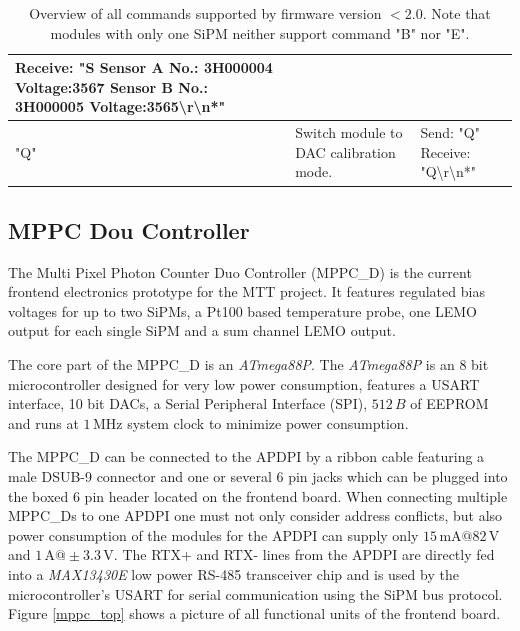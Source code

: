 \documentclass[]{article}
\begin{document}
\begin{table}
\begin{center}
\begin{tabular}[]{|l||p{6cm}|p{4cm}|}
			\newline Receive: "S Sensor A No.: 3H000004 Voltage:3567 Sensor B No.: 3H000005 Voltage:3565\textbackslash r\textbackslash n*" \\
			\hline
			"Q" & Switch module to DAC calibration mode. & Send: "Q" \newline Receive: "Q\textbackslash r\textbackslash n*" \\
			\hline
			\end{tabular}
		\end{center}
		\caption{Overview of all commands supported by firmware version $<2.0$. Note that modules with only one SiPM neither support command "B" nor "E".}
		\label{sipm_bus_table}
	\end{table}

\subsection{MPPC Dou Controller}

The Multi Pixel Photon Counter Duo Controller (MPPC\_D) is the current frontend electronics prototype for the MTT project. It features regulated bias voltages for up to two SiPMs, 
a Pt100 based temperature probe, one LEMO output for each single SiPM and a sum channel LEMO output.

The core part of the MPPC\_D is an \emph{ATmega88P}. The \emph{ATmega88P} is an 8 bit microcontroller designed for very low power consumption, features a 
USART interface, 10 bit DACs, a Serial Peripheral Interface (SPI), $512\,B$ of EEPROM and runs at $1\,\text{MHz}$ system clock to minimize power consumption. 

The MPPC\_D can be connected to the APDPI by a ribbon cable featuring a male DSUB-9 connector and one or several 6 pin jacks which can be plugged into the boxed 6 pin header
located on the frontend board. When connecting multiple MPPC\_Ds to one APDPI one must not only consider address conflicts, but also power consumption of the modules for the APDPI
can supply only $15\,\text{mA}@82\,\text{V}$ and $1\,\text{A}@\pm3.3\,\text{V}$. The RTX+ and RTX- lines from the APDPI are directly fed into a \emph{MAX13430E} low power RS-485 
transceiver chip and is used by the microcontroller's USART for serial communication using the SiPM bus protocol.  
Figure \ref{mppc_top} shows a picture of all functional units of the frontend board.
	
\end{document}
